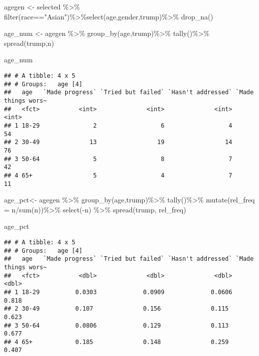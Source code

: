 \documentclass[
]{article}
\newenvironment{Shaded}{\begin{snugshade}}{\end{snugshade}}
\newcommand{\AttributeTok}[1]{\textcolor[rgb]{0.77,0.63,0.00}{#1}}
\newcommand{\FunctionTok}[1]{\textcolor[rgb]{0.00,0.00,0.00}{#1}}
\newcommand{\NormalTok}[1]{#1}
\newcommand{\OtherTok}[1]{\textcolor[rgb]{0.56,0.35,0.01}{#1}}
\newcommand{\SpecialCharTok}[1]{\textcolor[rgb]{0.00,0.00,0.00}{#1}}
\newcommand{\StringTok}[1]{\textcolor[rgb]{0.31,0.60,0.02}{#1}}
\begin{document}
\begin{Shaded}
\begin{Highlighting}[]
\NormalTok{agegen }\OtherTok{\textless{}{-}}\NormalTok{ selected }\SpecialCharTok{\%\textgreater{}\%} \FunctionTok{filter}\NormalTok{(race}\SpecialCharTok{==}\StringTok{"Asian"}\NormalTok{)}\SpecialCharTok{\%\textgreater{}\%}\FunctionTok{select}\NormalTok{(age,gender,trump)}\SpecialCharTok{\%\textgreater{}\%} \FunctionTok{drop\_na}\NormalTok{()}

\NormalTok{age\_num }\OtherTok{\textless{}{-}}\NormalTok{ agegen }\SpecialCharTok{\%\textgreater{}\%}
  \FunctionTok{group\_by}\NormalTok{(age,trump)}\SpecialCharTok{\%\textgreater{}\%}
  \FunctionTok{tally}\NormalTok{()}\SpecialCharTok{\%\textgreater{}\%}
  \FunctionTok{spread}\NormalTok{(trump,n)}

\NormalTok{age\_num}
\end{Highlighting}
\end{Shaded}

\begin{verbatim}
## # A tibble: 4 x 5
## # Groups:   age [4]
##   age   `Made progress` `Tried but failed` `Hasn't addressed` `Made things wors~
##   <fct>           <int>              <int>              <int>              <int>
## 1 18-29               2                  6                  4                 54
## 2 30-49              13                 19                 14                 76
## 3 50-64               5                  8                  7                 42
## 4 65+                 5                  4                  7                 11
\end{verbatim}

\begin{Shaded}
\begin{Highlighting}[]
\NormalTok{age\_pct}\OtherTok{\textless{}{-}}\NormalTok{ agegen }\SpecialCharTok{\%\textgreater{}\%}
  \FunctionTok{group\_by}\NormalTok{(age,trump)}\SpecialCharTok{\%\textgreater{}\%}
  \FunctionTok{tally}\NormalTok{()}\SpecialCharTok{\%\textgreater{}\%}
  \FunctionTok{mutate}\NormalTok{(}\AttributeTok{rel\_freq =}\NormalTok{ n}\SpecialCharTok{/}\FunctionTok{sum}\NormalTok{(n))}\SpecialCharTok{\%\textgreater{}\%}
  \FunctionTok{select}\NormalTok{(}\SpecialCharTok{{-}}\NormalTok{n) }\SpecialCharTok{\%\textgreater{}\%}
  \FunctionTok{spread}\NormalTok{(trump, rel\_freq) }

\NormalTok{age\_pct}
\end{Highlighting}
\end{Shaded}

\begin{verbatim}
## # A tibble: 4 x 5
## # Groups:   age [4]
##   age   `Made progress` `Tried but failed` `Hasn't addressed` `Made things wors~
##   <fct>           <dbl>              <dbl>              <dbl>              <dbl>
## 1 18-29          0.0303             0.0909             0.0606              0.818
## 2 30-49          0.107              0.156              0.115               0.623
## 3 50-64          0.0806             0.129              0.113               0.677
## 4 65+            0.185              0.148              0.259               0.407
\end{verbatim}
\end{document}
